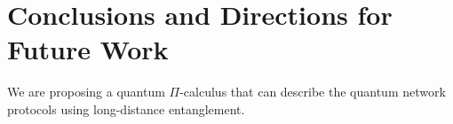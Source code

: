 \documentclass[a4paper,UKenglish,cleveref, autoref, thm-restate]{lipics-v2021}
\begin{document}









\section{Conclusions and Directions for Future Work} \label{sec:conclusions}

We are proposing a quantum $\Pi$-calculus that can describe the quantum network protocols using long-distance entanglement. 



\end{document}
